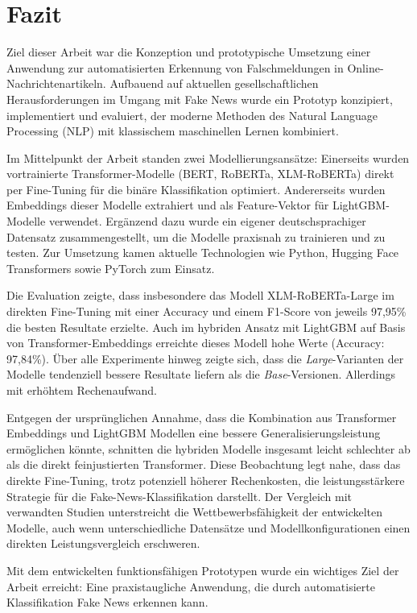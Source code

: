 \chapter{Fazit}
\label{chap:fazit}

Ziel dieser Arbeit war die Konzeption und prototypische Umsetzung einer Anwendung zur automatisierten Erkennung von Falschmeldungen in Online-Nachrichtenartikeln. 
Aufbauend auf aktuellen gesellschaftlichen Herausforderungen im Umgang mit Fake News wurde ein Prototyp konzipiert, 
implementiert und evaluiert, der moderne Methoden des Natural Language Processing (NLP) mit klassischem maschinellen Lernen kombiniert.

Im Mittelpunkt der Arbeit standen zwei Modellierungsansätze: Einerseits wurden vortrainierte Transformer-Modelle (BERT, RoBERTa, XLM-RoBERTa) 
direkt per Fine-Tuning für die binäre Klassifikation optimiert. Andererseits wurden Embeddings dieser Modelle extrahiert und als Feature-Vektor 
für LightGBM-Modelle verwendet. Ergänzend dazu wurde ein eigener deutschsprachiger Datensatz zusammengestellt, um die Modelle praxisnah zu trainieren und zu testen.
Zur Umsetzung kamen aktuelle Technologien wie Python, Hugging Face Transformers sowie PyTorch zum Einsatz.

Die Evaluation zeigte, dass insbesondere das Modell XLM-RoBERTa-Large im direkten Fine-Tuning mit einer Accuracy und einem F1-Score von jeweils 97,95\% 
die besten Resultate erzielte. Auch im hybriden Ansatz mit LightGBM auf Basis von Transformer-Embeddings erreichte dieses Modell hohe Werte (Accuracy: 97,84\%). 
Über alle Experimente hinweg zeigte sich, dass die \textit{Large}-Varianten der Modelle tendenziell bessere Resultate liefern als die \textit{Base}-Versionen. 
Allerdings mit erhöhtem Rechenaufwand.

Entgegen der ursprünglichen Annahme, dass die Kombination aus Transformer Embeddings und LightGBM Modellen eine bessere Generalisierungsleistung
ermöglichen könnte, schnitten die hybriden Modelle insgesamt leicht schlechter ab als die direkt feinjustierten Transformer. 
Diese Beobachtung legt nahe, dass das direkte Fine-Tuning, trotz potenziell höherer Rechenkosten, die leistungsstärkere Strategie für die Fake-News-Klassifikation 
darstellt. Der Vergleich mit verwandten Studien unterstreicht die Wettbewerbsfähigkeit der entwickelten Modelle, auch wenn unterschiedliche Datensätze und 
Modellkonfigurationen einen direkten Leistungsvergleich erschweren.

Mit dem entwickelten funktionsfähigen Prototypen wurde ein wichtiges Ziel der Arbeit erreicht: 
Eine praxistaugliche Anwendung, die durch automatisierte Klassifikation Fake News erkennen kann.

